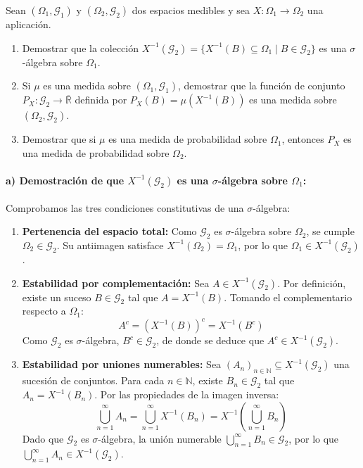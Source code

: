 \newpage %

\begin{problema}
Sean $(\Omega_1, \mathcal{G}_1)$ y $(\Omega_2, \mathcal{G}_2)$ dos espacios medibles y sea $X : \Omega_1 \to \Omega_2$ una aplicación.
\begin{enumerate}[label=\alph*)]
    \item Demostrar que la colección $X^{-1}(\mathcal{G}_2) = \{ X^{-1}(B) \subseteq \Omega_1 \mid B \in \mathcal{G}_2 \}$ es una $\sigma$-álgebra sobre $\Omega_1$.
    \item Si $\mu$ es una medida sobre $(\Omega_1, \mathcal{G}_1)$, demostrar que la función de conjunto $P_X : \mathcal{G}_2 \to \overline{\mathbb{R}}$ definida por $P_X(B) = \mu(X^{-1}(B))$ es una medida sobre $(\Omega_2, \mathcal{G}_2)$.
    \item Demostrar que si $\mu$ es una medida de probabilidad sobre $\Omega_1$, entonces $P_X$ es una medida de probabilidad sobre $\Omega_2$.
\end{enumerate}

\tcblower

\paragraph{a) Demostración de que $X^{-1}(\mathcal{G}_2)$ es una $\sigma$-álgebra sobre $\Omega_1$:}
Comprobamos las tres condiciones constitutivas de una $\sigma$-álgebra:
\begin{enumerate}[label=\arabic*.]
    \item \textbf{Pertenencia del espacio total:} Como $\mathcal{G}_2$ es $\sigma$-álgebra sobre $\Omega_2$, se cumple $\Omega_2 \in \mathcal{G}_2$. Su antiimagen satisface $X^{-1}(\Omega_2) = \Omega_1$, por lo que $\Omega_1 \in X^{-1}(\mathcal{G}_2)$.
    \item \textbf{Estabilidad por complementación:} Sea $A \in X^{-1}(\mathcal{G}_2)$. Por definición, existe un suceso $B \in \mathcal{G}_2$ tal que $A = X^{-1}(B)$. Tomando el complementario respecto a $\Omega_1$:
    \[
        A^c = (X^{-1}(B))^c = X^{-1}(B^c)
    \]
    Como $\mathcal{G}_2$ es $\sigma$-álgebra, $B^c \in \mathcal{G}_2$, de donde se deduce que $A^c \in X^{-1}(\mathcal{G}_2)$.
    \item \textbf{Estabilidad por uniones numerables:} Sea $(A_n)_{n \in \mathbb{N}} \subseteq X^{-1}(\mathcal{G}_2)$ una sucesión de conjuntos. Para cada $n \in \mathbb{N}$, existe $B_n \in \mathcal{G}_2$ tal que $A_n = X^{-1}(B_n)$. Por las propiedades de la imagen inversa:
    \[
        \bigcup_{n=1}^\infty A_n = \bigcup_{n=1}^\infty X^{-1}(B_n) = X^{-1}\left( \bigcup_{n=1}^\infty B_n \right)
    \]
    Dado que $\mathcal{G}_2$ es $\sigma$-álgebra, la unión numerable $\bigcup_{n=1}^\infty B_n \in \mathcal{G}_2$, por lo que $\bigcup_{n=1}^\infty A_n \in X^{-1}(\mathcal{G}_2)$.
\end{enumerate}


\end{problema}
